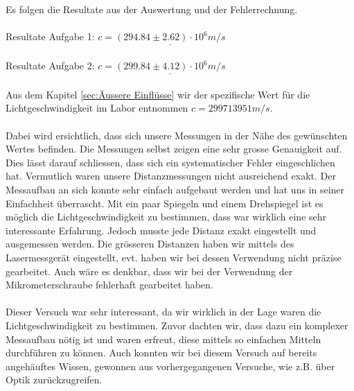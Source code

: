 Es folgen die Resultate aus der Auswertung und der Fehlerrechnung.\\
\\
Resultate Aufgabe 1: $c = \underline{(294.84 \pm 2.62) \cdot 10^6 m/s}$\\
\\
Resultate Aufgabe 2: $c = \underline{(299.84 \pm 4.12) \cdot 10^6 m/s}$\\
\\
Aus dem Kapitel \ref{sec:Äussere Einflüsse} wir der spezifische Wert für die Lichtgeschwindigkeit im Labor entnommen $c = 299713951 m/s$.\\
\\
Dabei wird ersichtlich, dass sich unsere Messungen in der Nähe des gewünschten Wertes befinden. Die Messungen selbst zeigen eine sehr grosse Genauigkeit auf. Dies lässt darauf schliessen, dass sich ein systematischer Fehler eingeschlichen hat. Vermutlich waren unsere Distanzmessungen nicht ausreichend exakt. Der Messaufbau an sich konnte sehr einfach aufgebaut werden und hat uns in seiner Einfachheit überrascht. Mit ein paar Spiegeln und einem Drehspiegel ist es möglich die Lichtgeschwindigkeit zu bestimmen, dass war wirklich eine sehr interessante Erfahrung. Jedoch musste jede Distanz exakt eingestellt und ausgemessen werden. Die grösseren Distanzen haben wir mittels des Lasermessgerät eingestellt, evt. haben wir bei dessen Verwendung nicht präzise gearbeitet. Auch wäre es denkbar, dass wir bei der Verwendung der Mikrometerschraube fehlerhaft gearbeitet haben.\\
\\
Dieser Versuch war sehr interessant, da wir wirklich in der Lage waren die Lichtgeschwindigkeit zu bestimmen. Zuvor dachten wir, dass dazu ein komplexer Messaufbau nötig ist und waren erfreut, diese mittels so einfachen Mitteln durchführen zu können. Auch konnten wir bei diesem Versuch auf bereits angehäuftes Wissen, gewonnen aus vorhergegangenen Versuche, wie z.B. über Optik zurückzugreifen.

